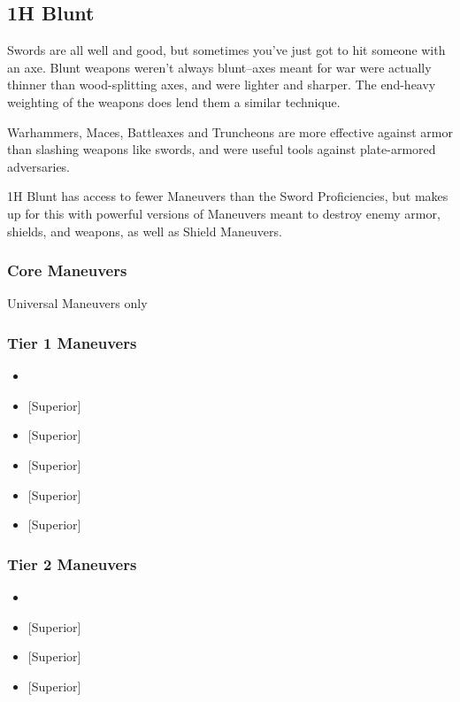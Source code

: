 \documentclass[oneside,11pt,english]{book}
\begin{document}
\subsection{1H Blunt}
Swords are all well and good, but sometimes you’ve just got to hit someone with an axe. Blunt 
weapons weren’t always blunt--axes meant for war were actually thinner than
wood-splitting axes, and were lighter and sharper. The end-heavy weighting of
the weapons does lend them a similar technique.  

Warhammers, Maces, Battleaxes and Truncheons are more effective against armor than slashing weapons 
like swords, and were useful tools against plate-armored adversaries. 

1H Blunt has access to fewer Maneuvers than the Sword Proficiencies, but makes up for this with 
powerful versions of Maneuvers meant to destroy enemy armor, shields, and weapons, as well as Shield Maneuvers.

\subsubsection{Core Maneuvers}
Universal Maneuvers only

\subsubsection{Tier 1 Maneuvers}
\vspace{-5pt}\begin{itemize}
  [itemsep=0.5mm]
\item {}
\item {} [Superior]
\item {} [Superior]
\item {} [Superior]
\item {} [Superior]
\item {} [Superior]
\end{itemize}
\subsubsection{Tier 2 Maneuvers}
\vspace{-5pt}\begin{itemize}
  [itemsep=0.5mm]
\item {}
\item {} [Superior] 
\item {} [Superior] 
\item {} [Superior] 
\end{itemize}
\end{document}
